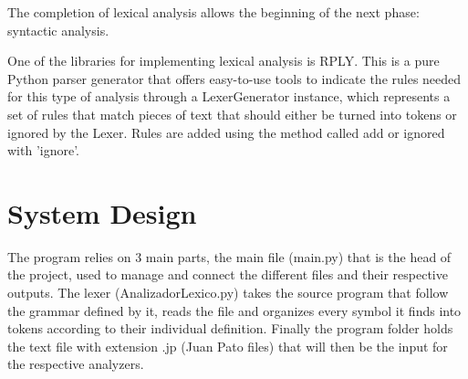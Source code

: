 \documentclass[letterpaper,12pt,oneside]{article}
\begin{document}
The completion of lexical analysis allows the beginning of the next phase: syntactic analysis. \cite{ramirez_analizadores}


\bigskip
One of the libraries for implementing lexical analysis is RPLY. This is a pure Python parser generator that offers easy-to-use tools to indicate the rules needed for this type of analysis through a LexerGenerator instance, which represents a set of rules that match pieces of text that should either be turned into tokens or ignored by the Lexer. Rules are added using the method called add or ignored with 'ignore'.

\bigskip


\section{System Design}
The program relies on 3 main parts, the main file (main.py) that is the head of the project, used to manage and connect the different files and their respective outputs. The lexer (AnalizadorLexico.py) takes the source program that follow the grammar defined by it, reads the file and organizes every symbol it finds into tokens according to their individual definition. Finally the program folder holds the text file with extension .jp (Juan Pato files) that will then be the input for the respective analyzers.
\end{document}
